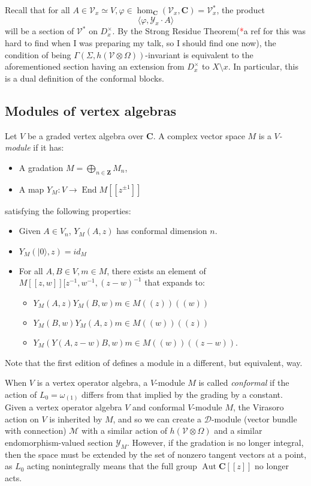 \documentclass{article}
\newcommand{\CC}{\mathbold{C}}
\newcommand{\ZZ}{\mathbold{Z}}
\newcommand{\vac}{|0\rangle}
\newcommand{\Dd}{\mathcal{D}}
\newcommand{\Mm}{\mathcal{M}}
\newcommand{\Vv}{\mathcal{V}}
\newcommand{\Yy}{\mathcal{Y}}
\newcommand{\tk}{\textcolor{red}{*}}
\DeclareMathOperator{\End}{End}
\DeclareMathOperator{\Aut}{Aut}
\begin{document}
Recall that for all $A \in \Vv_x \simeq V, \varphi \in \hom_\CC(\Vv_x,\CC) = \Vv_x^*$, the product
\[\langle \varphi,\Yy_x \cdot A \rangle \]
will be a section of $\Vv^*$ on $D_x^\times$.  By the Strong Residue Theorem(\tk a ref for this was hard to find when I was preparing my talk, so I should find one now), the condition of being $\Gamma(\Sigma,h(\Vv \otimes \Omega))$-invariant is equivalent to the aforementioned section having an extension from $D_x^\times$ to $X \setminus x$.  In particular, this is a dual definition of the conformal blocks.

\subsection{Modules of vertex algebras}
\label{sec:voareps}
Let $V$ be a graded vertex algebra over $\CC$.  A complex vector space $M$ is a \textit{$V$-module} if it has:
\begin{itemize}
\item A gradation $M=\bigoplus_{n \in \ZZ}M_n$,
\item A map $Y_M: V \rightarrow \End{M[[z^{\pm 1}]]}$
\end{itemize}
satisfying the following properties:
\begin{itemize}
\item Given $A \in V_n$, $Y_M(A,z)$ has conformal dimension $n$.
\item $Y_M(\vac,z)=id_M$
\item For all $A,B \in V, m \in M$, there exists an element of $M[[z,w]][z^{-1},w^{-1},(z-w)^{-1}$ that expands to:
  \begin{itemize}
  \item $Y_M(A,z)Y_M(B,w)m \in M((z))((w))$
  \item $Y_M(B,w)Y_M(A,z)m \in M((w))((z))$
  \item $Y_M(Y(A,z-w)B,w)m \in M((w))((z-w))$.
  \end{itemize}

\end{itemize}
Note that the first edition of \cite{MR2082709} defines a module in a different, but equivalent, way.

When $V$ is a vertex operator algebra, a $V$-module $M$ is called \textit{conformal} if the action of $L_0=\omega_{(1)}$ differs from that implied by the grading by a constant.  Given a vertex operator algebra $V$ and conformal $V$-module $M$, the Virasoro action on $V$ is inherited by $M$, and so we can create a $\Dd$-module (vector bundle with connection) $\Mm$ with a similar action of $h(\Vv \otimes \Omega)$ and a similar endomorphism-valued section $\Yy_M$.  However, if the gradation is no longer integral, then the space must be extended by the set of nonzero tangent vectors at a point, as $L_0$ acting nonintegrally means that the full group $\Aut \CC[[z]]$ no longer acts.
\end{document}
